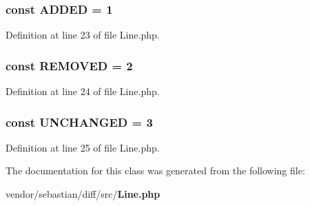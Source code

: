 \subsubsection[{A\+D\+D\+E\+D}]{\setlength{\rightskip}{0pt plus 5cm}const A\+D\+D\+E\+D = 1}\label{class_sebastian_bergmann_1_1_diff_1_1_line_a9dcf44632176616f583582396a5d6ec9}


Definition at line 23 of file Line.\+php.

\subsubsection[{R\+E\+M\+O\+V\+E\+D}]{\setlength{\rightskip}{0pt plus 5cm}const R\+E\+M\+O\+V\+E\+D = 2}\label{class_sebastian_bergmann_1_1_diff_1_1_line_a407d200e9f16e51a21be57a9fcec09f0}


Definition at line 24 of file Line.\+php.

\subsubsection[{U\+N\+C\+H\+A\+N\+G\+E\+D}]{\setlength{\rightskip}{0pt plus 5cm}const U\+N\+C\+H\+A\+N\+G\+E\+D = 3}\label{class_sebastian_bergmann_1_1_diff_1_1_line_a4aebc93452a080d340addea1ef92b4dc}


Definition at line 25 of file Line.\+php.



The documentation for this class was generated from the following file\+:\begin{DoxyCompactItemize}
\item 
vendor/sebastian/diff/src/{\bf Line.\+php}\end{DoxyCompactItemize}

